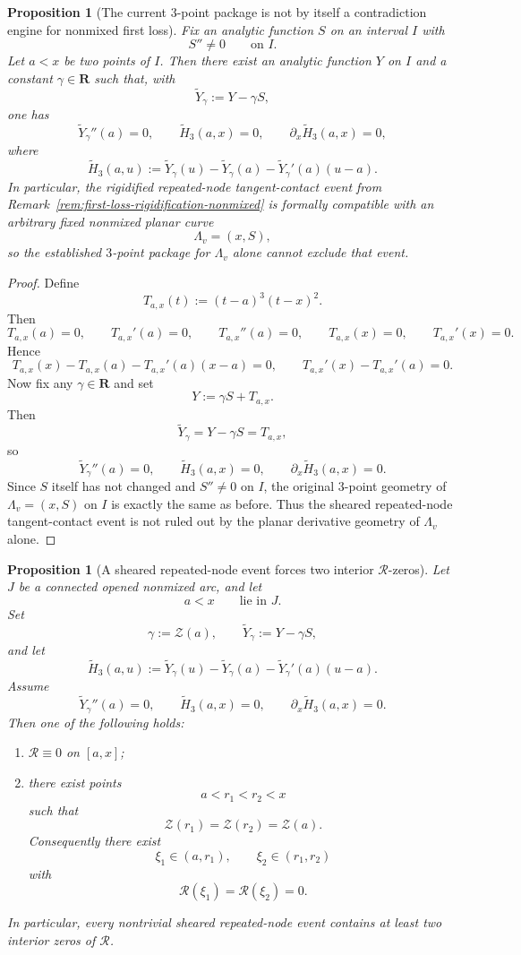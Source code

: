 \documentclass[11pt,a4paper]{amsart}
\theoremstyle{plain}
\newtheorem{proposition}[theorem]{Proposition}
\theoremstyle{definition}
\begin{document}
\begin{proposition}[The current $3$-point package is not by itself a contradiction engine for nonmixed first loss]
\label{prop:three-point-package-not-enough-for-nonmixed-first-loss}
Fix an analytic function $S$ on an interval $I$ with
\[
S''\neq 0
\qquad\text{on }I.
\]
Let $a<x$ be two points of $I$. Then there exist an analytic function $Y$ on
$I$ and a constant $\gamma\in\mathbf R$ such that, with
\[
\widetilde Y_\gamma:=Y-\gamma S,
\]
one has
\[
\widetilde Y_\gamma''(a)=0,
\qquad
\widetilde H_3(a,x)=0,
\qquad
\partial_x\widetilde H_3(a,x)=0,
\]
where
\[
\widetilde H_3(a,u):=
\widetilde Y_\gamma(u)-\widetilde Y_\gamma(a)-\widetilde Y_\gamma'(a)(u-a).
\]
In particular, the rigidified repeated-node tangent-contact event from
Remark~\ref{rem:first-loss-rigidification-nonmixed} is formally compatible with
an arbitrary fixed nonmixed planar curve
\[
\Lambda_v=(x,S),
\]
so the established $3$-point package for $\Lambda_v$ alone cannot exclude that
event.
\end{proposition}

\begin{proof}
Define
\[
T_{a,x}(t):=(t-a)^3(t-x)^2.
\]
Then
\[
T_{a,x}(a)=0,
\qquad
T_{a,x}'(a)=0,
\qquad
T_{a,x}''(a)=0,
\qquad
T_{a,x}(x)=0,
\qquad
T_{a,x}'(x)=0.
\]
Hence
\[
T_{a,x}(x)-T_{a,x}(a)-T_{a,x}'(a)(x-a)=0,
\qquad
T_{a,x}'(x)-T_{a,x}'(a)=0.
\]
Now fix any $\gamma\in\mathbf R$ and set
\[
Y:=\gamma S+T_{a,x}.
\]
Then
\[
\widetilde Y_\gamma=Y-\gamma S=T_{a,x},
\]
so
\[
\widetilde Y_\gamma''(a)=0,
\qquad
\widetilde H_3(a,x)=0,
\qquad
\partial_x\widetilde H_3(a,x)=0.
\]
Since $S$ itself has not changed and $S''\neq 0$ on $I$, the original
$3$-point geometry of $\Lambda_v=(x,S)$ on $I$ is exactly the same as before.
Thus the sheared repeated-node tangent-contact event is not ruled out by the
planar derivative geometry of $\Lambda_v$ alone.
\end{proof}

\begin{proposition}[A sheared repeated-node event forces two interior $\mathcal R$-zeros]
\label{prop:sheared-repeated-node-forces-two-R-zeros}
Let $J$ be a connected opened nonmixed arc, and let
\[
a<x
\qquad\text{lie in }J.
\]
Set
\[
\gamma:=\mathcal Z(a),
\qquad
\widetilde Y_\gamma:=Y-\gamma S,
\]
and let
\[
\widetilde H_3(a,u):=
\widetilde Y_\gamma(u)-\widetilde Y_\gamma(a)-\widetilde Y_\gamma'(a)(u-a).
\]
Assume
\[
\widetilde Y_\gamma''(a)=0,
\qquad
\widetilde H_3(a,x)=0,
\qquad
\partial_x\widetilde H_3(a,x)=0.
\]
Then one of the following holds:
\begin{enumerate}
\item $\mathcal R\equiv 0$ on $[a,x]$;
\item there exist points
\[
a<r_1<r_2<x
\]
such that
\[
\mathcal Z(r_1)=\mathcal Z(r_2)=\mathcal Z(a).
\]
Consequently there exist
\[
\xi_1\in(a,r_1),
\qquad
\xi_2\in(r_1,r_2)
\]
with
\[
\mathcal R(\xi_1)=\mathcal R(\xi_2)=0.
\]
\end{enumerate}
In particular, every nontrivial sheared repeated-node event contains at least two
interior zeros of $\mathcal R$.
\end{proposition}
\end{document}
